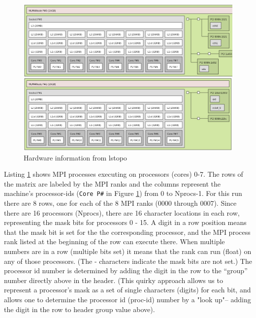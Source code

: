 \documentclass[10pt,a4paper]{report}
\begin{document}
\begin{figure}[t]
\centering
\includegraphics[scale=0.34]{lstopo}
\caption{Hardware information from lstopo\label{fig:lstopo1}}
\end{figure}

Listing \ref{fig:lstopo1} shows  MPI processes executing on processors (cores) 0-7. 
The rows of the matrix are labeled by the MPI ranks and the columns represent the
machine's processor-ids (\verb+Core P#+ in Figure \ref{fig:lstopo1}) from 0 to Nprocs-1.
For this run there are 8 rows, one for each of the 8 MPI ranks (0000 through 0007).
Since there are 16 processors (Nprocs), there are 16 character locations in each row, 
representing the mask bits for processors 0 - 15.
A digit in a row position means that the mask bit is set for the the corresponding
processor, and the MPI process rank listed at the beginning of the row can execute there.
When multiple numbers 
are in a row (multiple bits set) it means that the rank can run (float) on any 
of those processors. (The - characters indicate the mask bits are not set.)
The processor id number is determined by adding the digit in the row to the ``group'' number
directly above in the header. (This quirky approach allows us to represent a 
processor's mask as a set of single characters (digits)
for each bit, and allows one to determine the processor id (proc-id) number by a "look up"-- 
adding the digit in the row to header group value above).
\end{document}
